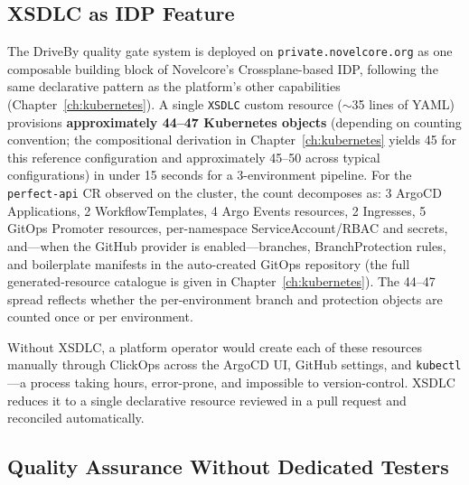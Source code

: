 \subsection{XSDLC as IDP Feature}
\label{subsec:xsdlc-idp}

The DriveBy quality gate system is deployed on \texttt{private.\allowbreak novelcore.\allowbreak org} as one composable building block of Novelcore's Crossplane-based IDP, following the same declarative pattern as the platform's other capabilities (Chapter~\ref{ch:kubernetes}). A single \texttt{XSDLC} custom resource (\(\sim\)35 lines of YAML) provisions \textbf{approximately 44--47 Kubernetes objects} (depending on counting convention; the compositional derivation in Chapter~\ref{ch:kubernetes} yields 45 for this reference configuration and approximately 45--50 across typical configurations) in under 15 seconds for a 3-environment pipeline. For the \texttt{perfect-api} CR observed on the cluster, the count decomposes as: 3 ArgoCD Applications, 2 WorkflowTemplates, 4 Argo Events resources, 2 Ingresses, 5 GitOps Promoter resources, per-namespace ServiceAccount/RBAC and secrets, and---when the GitHub provider is enabled---branches, BranchProtection rules, and boilerplate manifests in the auto-created GitOps repository (the full generated-resource catalogue is given in Chapter~\ref{ch:kubernetes}). The 44--47 spread reflects whether the per-environment branch and protection objects are counted once or per environment.

Without XSDLC, a platform operator would create each of these resources manually through ClickOps across the ArgoCD UI, GitHub settings, and \texttt{kubectl}---a process taking hours, error-prone, and impossible to version-control. XSDLC reduces it to a single declarative resource reviewed in a pull request and reconciled automatically.

\subsection{Quality Assurance Without Dedicated Testers}
\label{subsec:no-testers}

